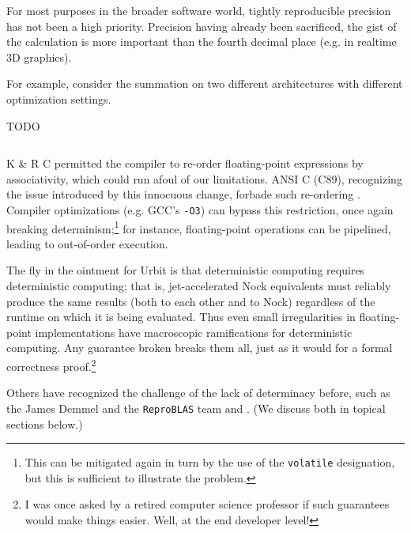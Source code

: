 \documentclass[twoside]{article}
\begin{document}
For most purposes in the broader software world, tightly reproducible precision has not been a high priority.  Precision having already been sacrificed, the gist of the calculation is more important than the fourth decimal place (e.g. in realtime 3D graphics).

For example, consider the summation
on two different architectures with different optimization settings.

TODO
\lstset{language=C}
\begin{lstlisting}

\end{lstlisting}

K \& R C permitted the compiler to re-order floating-point expressions by associativity, which could run afoul of our limitations.  ANSI C (C89), recognizing the issue introduced by this innocuous change, forbade such re-ordering \citep{MacDonald1991}.  Compiler optimizations (e.g. GCC's \texttt{-O3}) can bypass this restriction, once again breaking determinism;\footnote{This can be mitigated again in turn by the use of the \texttt{volatile} designation, but this is sufficient to illustrate the problem.} for instance, floating-point operations can be pipelined, leading to out-of-order execution.

The fly in the ointment for Urbit is that deterministic computing requires deterministic computing; that is, jet-accelerated Nock equivalents must reliably produce the same results (both to each other and to Nock) regardless of the runtime on which it is being evaluated.  Thus even small irregularities in floating-point implementations have macroscopic ramifications for deterministic computing.  Any guarantee broken breaks them all, just as it would for a formal correctness proof.\footnote{I was once asked by a retired computer science professor if such guarantees would make things easier.  Well, at the end developer level!}

Others have recognized the challenge of the lack of determinacy before, such as the James Demmel and the \texttt{ReproBLAS} team \citep{Demmel2013, TODO} and \citeauthor{Dawson2013}.  (We discuss both in topical sections below.)
\end{document}
